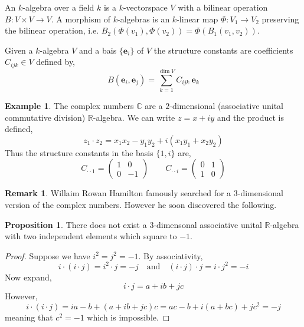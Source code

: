 \documentclass[12pt]{extarticle}
\newcommand{\R}{\mathbb{R}}
\theoremstyle{definition}
\newtheorem{proposition}[theorem]{Proposition}
\newtheorem{example}[theorem]{Example}
\newtheorem{remark}{Remark}
\newenvironment{definition}[1][Definition:]{\begin{trivlist}
\item[\hskip \labelsep {\bfseries #1}]}{\end{trivlist}}
\renewcommand{\bf}[1]{\mathbf{#1}}
\newcommand{\C}{\mathbb{C}}
\begin{document}
\begin{definition}
An $k$-algebra over a field $k$ is a $k$-vectorspace $V$ with a bilinear operation $B : V \times V \to V$. A morphism of $k$-algebras is an $k$-linear map $\Phi : V_1 \to V_2$ preserving the bilinear operation, i.e. $B_2(\Phi(v_1), \Phi(v_2)) = \Phi(B_1(v_1, v_2))$. 
\end{definition}

\begin{definition}
Given a $k$-algebra $V$ and a bais $\{ \bf{e}_i \}$ of $V$ the structure constants are coefficients $C_{ijk} \in V$ defined by,
\[ B(\bf{e}_i, \bf{e}_j) = \sum_{k = 1}^{\dim{V}} C_{ijk} \: \bf{e}_k \] 
\end{definition}

\begin{example}
The complex numbers $\C$ are a $2$-dimensional (associative unital commutative division) $\R$-algebra. We can write $z = x + i y$ and the product is defined,
\[ z_1 \cdot z_2 = x_1 x_2 - y_1 y_2 + i (x_1 y_1 + x_2 y_2)  \]
Thus the structure constants in the basis $\{ 1, i \}$ are,
\[ C_{\cdot \cdot 1} = \begin{pmatrix}
1 & 0
\\
0 & -1
\end{pmatrix} \quad \quad C_{\cdot \cdot i} = \begin{pmatrix}
0 & 1
\\
1 & 0
\end{pmatrix}  \]
\end{example}

\begin{remark}
Willaim Rowan Hamilton famously searched for a $3$-dimensional version of the complex numbers. However he soon discovered the following.
\end{remark}

\begin{proposition}
There does not exist a $3$-dimensonal associative unital $\R$-algebra with two independent elements which square to $-1$.
\end{proposition}

\begin{proof}
Suppose we have $i^2 = j^2 = -1$. By associativity,
\[ i \cdot (i \cdot j) = i^2 \cdot j = - j \quad \text{and} \quad (i \cdot j) \cdot j = i \cdot j^2 = - i \]
Now expand,
\[ i \cdot j = a + i b + j c \]
However,
\[ i \cdot (i \cdot j) = i a - b + (a + i b + j c)c = ac - b + i(a  + bc) + j c^2 = - j \]
meaning that $c^2 = - 1$ which is impossible.  
\end{proof}
\end{document}
